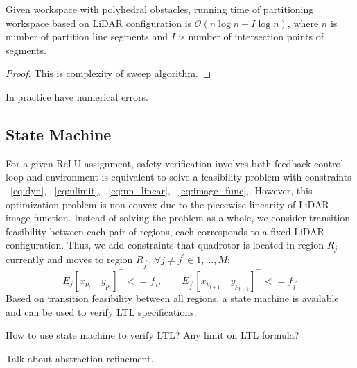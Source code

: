 \begin{theorem}
    Given workspace with polyhedral obstacles, running time of partitioning workspace based on LiDAR configuration is
    $\mathcal{O}(n\log{}n + I\log{}n)$, where $n$ is number of partition line segments 
    and $I$ is number of intersection points of segments.
    \begin{proof}
        {\color{blue} This is complexity of sweep algorithm.} 
    \end{proof}
\end{theorem}    

{\color{blue} In practice have numerical errors.}







\subsection{State Machine}


For a given ReLU assignment, safety verification involves both feedback control loop and environment 
is equivalent to solve a feasibility problem with constraints 
~\eqref{eq:dyn}, ~\eqref{eq:ulimit}, ~\eqref{eq:nn_linear}, ~\eqref{eq:image_func},.
However, this optimization problem is non-convex due to the piecewise linearity of LiDAR image function.
Instead of solving the problem as a whole, we consider transition feasibility between 
each pair of regions, each corresponds to a fixed LiDAR configuration. 
Thus, we add constraints that quadrotor is located in region $R_j$ currently and moves to region $R_{j^\prime}$,
$\forall j \neq j^\prime \in {1, ..., M}$:
\begin{equation}
    \label{eq:region}
    E_j[x_{p_t} \quad y_{p_t}]^\intercal <= f_j, \qquad E_{j^\prime}[x_{p_{t+1}} \quad y_{p_{t+1}}]^\intercal <= f_{j^\prime}
\end{equation}
Based on transition feasibility between all regions, a state machine is available and can be used to verify
LTL specifications.

{\color{blue} How to use state machine to verify LTL?}
{\color{blue} Any limit on LTL formula?}

{\color{blue} Talk about abstraction refinement.}

